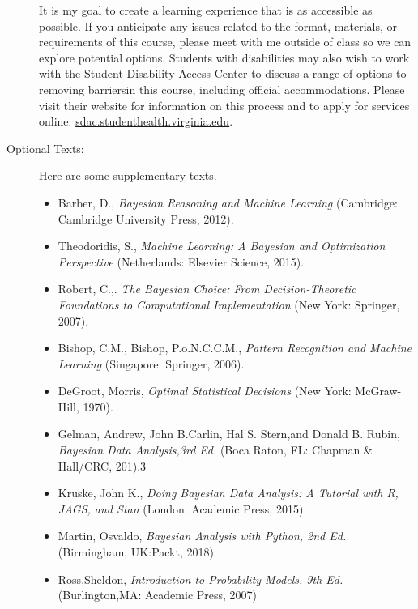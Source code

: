 \documentclass[11pt]{article}
\begin{document}
\begin{description}
It is my goal to create a learning experience that is as accessible as possible. If you anticipate any issues related to the format, materials, or requirements of this course, please meet with me outside of class so we can explore potential options. Students with disabilities may also wish to work with the Student Disability Access Center to discuss a range of options to removing barriersin this course, including official accommodations. Please visit their website for information on this process and to apply for services online: \url{sdac.studenthealth.virginia.edu}. 

\item[Optional Texts:]  

Here are some supplementary texts.

\begin{itemize}
\item Barber, D., \textit{Bayesian Reasoning and Machine Learning} (Cambridge: Cambridge University Press, 2012).
\item Theodoridis, S., \textit{Machine Learning: A Bayesian and Optimization Perspective } (Netherlands:
Elsevier Science, 2015).
\item Robert, C.,. \textit{The Bayesian Choice: From Decision-Theoretic Foundations to Computational
Implementation} (New York: Springer, 2007).
\item Bishop, C.M., Bishop, P.o.N.C.C.M., \textit{Pattern Recognition and Machine Learning} (Singapore:
Springer, 2006).
\item DeGroot, Morris, \textit{Optimal Statistical Decisions} (New York: McGraw-Hill, 1970).
\item Gelman, Andrew, John B.Carlin, Hal S. Stern,and Donald B. Rubin, \textit{Bayesian Data Analysis,3rd
Ed.} (Boca Raton, FL: Chapman \& Hall/CRC, 201).3
\item Kruske, John K., \textit{Doing Bayesian Data Analysis: A Tutorial with R, JAGS, and Stan} (London:
Academic Press, 2015)
\item Martin, Osvaldo, \textit{Bayesian Analysis with Python, 2nd Ed.} (Birmingham, UK:Packt, 2018)
\item Ross,Sheldon, \textit{Introduction to Probability Models, 9th Ed.} (Burlington,MA: Academic Press,
2007)
\end{itemize}


\end{description}
\end{document}
